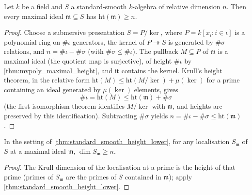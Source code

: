 \begin{theorem}
  \label{thm:standard_smooth_height_lower}
  \leanok
  Let \(k\) be a field and \(S\) a standard-smooth \(k\)-algebra of relative dimension
  \(n\). Then every maximal ideal \(\mathfrak m \subseteq S\) has
  \(\mathrm{ht}(\mathfrak m) \geq n\).
\end{theorem}
\begin{proof}
  \leanok
  Choose a submersive presentation \(S = P/\ker\), where
  \(P = k[x_i : i \in \iota]\) is a polynomial ring on \(\#\iota\) generators, the
  kernel of \(P \twoheadrightarrow S\) is generated by \(\#\sigma\) relations, and
  \(n = \#\iota - \#\sigma\) (with \(\#\sigma \leq \#\iota\)). The pullback
  \(M \subseteq P\) of \(\mathfrak m\) is a maximal ideal (the quotient map is
  surjective), of height \(\#\iota\) by \ref{thm:mvpoly_maximal_height}, and it contains
  the kernel. Krull's height theorem, in the relative form
  \(\mathrm{ht}(M) \leq \mathrm{ht}(M/\ker) + \mu(\ker)\) for a prime containing an
  ideal generated by \(\mu(\ker)\) elements, gives
  \[
    \#\iota = \mathrm{ht}(M) \leq \mathrm{ht}(\mathfrak m) + \#\sigma
  \]
  (the first isomorphism theorem identifies \(M/\ker\) with \(\mathfrak m\), and heights
  are preserved by this identification). Subtracting \(\#\sigma\) yields
  \(n = \#\iota - \#\sigma \leq \mathrm{ht}(\mathfrak m)\).
\end{proof}

\begin{lemma}
  \label{lem:standard_smooth_dim_lower_localized}
  \leanok
  In the setting of \ref{thm:standard_smooth_height_lower}, for any localisation
  \(S_{\mathfrak m}\) of \(S\) at a maximal ideal \(\mathfrak m\),
  \(\dim S_{\mathfrak m} \geq n\).
\end{lemma}
\begin{proof}
  \leanok
  The Krull dimension of the localisation at a prime is the height of that prime
  (primes of \(S_{\mathfrak m}\) are the primes of \(S\) contained in
  \(\mathfrak m\)); apply \ref{thm:standard_smooth_height_lower}.
\end{proof}

